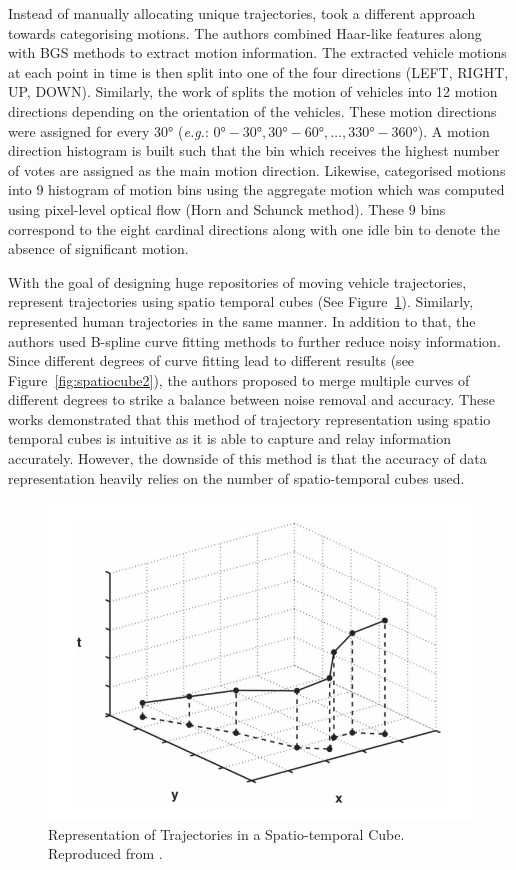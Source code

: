 Instead of manually allocating unique trajectories, 
took a different approach towards categorising motions. The authors combined
Haar-like features along with BGS methods to extract motion information. The
extracted vehicle motions at each point in time is then split into one of the
four directions (LEFT, RIGHT, UP, DOWN). Similarly, the work of
 splits the motion of vehicles into 12 motion directions
depending on the orientation of the vehicles. These motion directions were
assigned for every $\ang{30}$ (\emph{e.g.}: $\ang{0}-\ang{30}, \ang{30}-\ang{60}, \ldots,
\ang{330}-\ang{360}$). A motion direction histogram is built such that the bin
which receives the highest number of votes are assigned as the main motion direction. Likewise,  categorised motions into 9 histogram of motion bins using the aggregate motion which was computed using pixel-level optical flow (Horn and Schunck method). These 9 bins correspond to the eight cardinal directions along with one idle bin to denote the absence of significant motion.

With the goal of designing huge repositories of moving vehicle trajectories,  represent trajectories using spatio temporal cubes (See
Figure~\ref{fig:spatiocube}). Similarly,  represented human trajectories in the same manner. In addition to that, the authors used B-spline curve fitting methods to further reduce noisy information. Since different degrees of curve fitting lead to different results (see Figure~\ref{fig:spatiocube2}), the authors proposed to merge multiple curves of different degrees to strike a balance between noise removal and accuracy. These works demonstrated that this method of trajectory representation using spatio temporal cubes is intuitive as it is able to capture and relay information accurately. However, the downside of this method is that the accuracy of data representation heavily relies on the
number of spatio-temporal cubes used.

\begin{figure}[hbt!]
  \centering
  \includegraphics[width=.5\textwidth]{image/lit/spatiotemporal.PNG}
  \caption[Representation of Trajectories in a Spatio-temporal Cube]
 {Representation of Trajectories in a Spatio-temporal Cube. Reproduced from
 .}
  \label{fig:spatiocube}
\end{figure}


